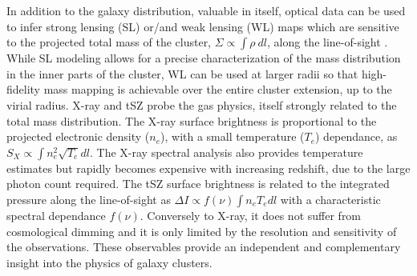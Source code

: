 \documentclass[11pt,a4paper,twoside,graphicx,color]{article}
\begin{document}
In addition to the galaxy distribution, valuable in itself, optical data can be used to infer strong lensing (SL) or/and weak lensing (WL) maps which are sensitive to the projected total mass of the cluster, $\Sigma \propto \int \rho \ dl$, along the line-of-sight \citep[see][for a review]{hoekstra2013}. While SL modeling allows for a precise characterization of the mass distribution in the inner parts of the cluster, WL can be used at larger radii so that high-fidelity mass mapping is achievable over the entire cluster extension, up to the virial radius. X-ray and tSZ probe the gas physics, itself strongly related to the total mass distribution. The X-ray surface brightness is proportional to the projected electronic density ($n_e$), with a small temperature ($T_e$) dependance, as $S_X \propto \int n_e^2 \sqrt{T_e} dl$. The X-ray spectral analysis also provides temperature estimates but rapidly becomes expensive with increasing redshift, due to the large photon count required. The tSZ surface brightness is related to the integrated pressure along the line-of-sight as $\Delta I \propto f(\nu) \int n_e T_e dl$ with a characteristic spectral dependance $f(\nu)$. Conversely to X-ray, it does not suffer from cosmological dimming and it is only limited by the resolution and sensitivity of the observations. These observables provide an independent and complementary insight into the physics of galaxy clusters.


\end{document}
